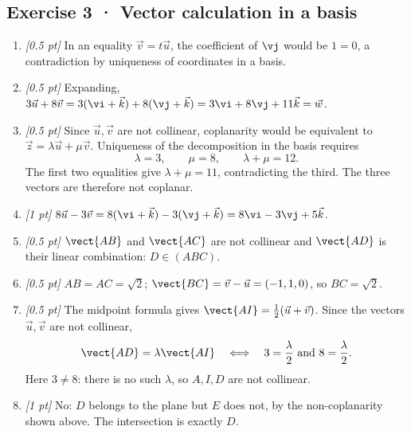 \subsection*{Exercise 3 · Vector calculation in a basis}\begin{enumerate}

\item \textit{[0.5 pt]} In an equality $\vec v=t\vec u$, the coefficient of $\vj $ would be $1=0$, a contradiction by uniqueness of coordinates in a basis.

\item \textit{[0.5 pt]} Expanding, $3\vec u+8\vec v=3(\vi +\vec k)+8(\vj +\vec k)=3\vi +8\vj +11\vec k=\vec w$.

\item \textit{[0.5 pt]} Since $\vec u,\vec v$ are not collinear, coplanarity would be equivalent to $\vec z=\lambda\vec u+\mu\vec v$. Uniqueness of the decomposition in the basis requires
\[\lambda=3,\qquad\mu=8,\qquad\lambda+\mu=12.\]
The first two equalities give $\lambda+\mu=11$, contradicting the third. The three vectors are therefore not coplanar.

\item \textit{[1 pt]} $8\vec u-3\vec v=8(\vi +\vec k)-3(\vj +\vec k)=8\vi -3\vj +5\vec k$.

\item \textit{[0.5 pt]} $\vect{AB}$ and $\vect{AC}$ are not collinear and $\vect{AD}$ is their linear combination: $D\in(ABC)$.

\item \textit{[0.5 pt]} $AB=AC=\sqrt2$; $\vect{BC}=\vec v-\vec u=(-1,1,0)$, so $BC=\sqrt2$.

\item \textit{[0.5 pt]} The midpoint formula gives $\vect{AI}=\frac12(\vec u+\vec v)$. Since the vectors $\vec u,\vec v$ are not collinear,
\[\vect{AD}=\lambda\vect{AI}\quad\Longleftrightarrow\quad 3=\frac{\lambda}{2}\ \text{and}\ 8=\frac{\lambda}{2}.\]
Here $3\ne 8$: there is no such $\lambda$, so $A,I,D$ are not collinear.

\item \textit{[1 pt]} No: $D$ belongs to the plane but $E$ does not, by the non-coplanarity shown above. The intersection is exactly $D$.

\end{enumerate}

